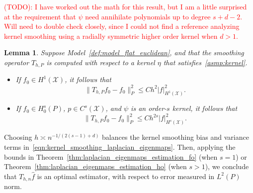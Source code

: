 \documentclass{article}
\newcommand{\1}{\mathbf{1}}
\newcommand{\mc}[1]{\mathcal{#1}}
\newcommand{\wh}[1]{\widehat{#1}}
\theoremstyle{alden}
\theoremstyle{aldenthm}
\newtheorem{theorem}{Theorem}
\newtheorem{lemma}{Lemma}
\theoremstyle{definition}
\theoremstyle{remark}
\begin{document}
\textcolor{red}{(TODO): I have worked out the math for this result, but I am a little surprised at the requirement that $\psi$ need annihilate polynomials up to degree $s + d - 2$. Will need to double check closely, since I could not find a reference analyzing kernel smoothing using a radially symmetric higher order kernel when $d > 1$.}
\begin{lemma}
	\label{lem:kernel_smoothing_bias}
	Suppose Model~\ref{def:model_flat_euclidean}, and that the smoothing operator $T_{h,P}$ is computed with respect to a kernel $\eta$ that satisfies~\ref{asmp:kernel}.
	\begin{itemize}
		\item If $f_0 \in H^1(\mc{X})$, it follows that
		\begin{equation*}
		\|T_{h,P}f_0 - f_0\|_P^2 \leq C h^{2} |f|_{H^1(\mc{X})}^2.
		\end{equation*}
		\item If $f_0 \in H_0^{s}(P)$, $p \in C^{s}(\mc{X})$, and $\psi$ is an order-$s$ kernel, it follows that
		\begin{equation*}
		\|T_{h,P}f_0 - f_0\|_P^2 \leq C h^{2s} |f|_{H^s(\mc{X})}^2.
		\end{equation*}
	\end{itemize}
\end{lemma}
Choosing $h \asymp n^{-1/(2(s - 1) + d)}$ balances the kernel smoothing bias and variance terms in~\eqref{eqn:kernel_smoothing_laplacian_eigenmaps}. Then, applying the bounds in Theorem~\ref{thm:laplacian_eigenmaps_estimation_fo} (when $s = 1$) or Theorem~\ref{thm:laplacian_eigenmaps_estimation_ho} (when $s > 1$), we conclude that $T_{h,n}\wh{f}$ is an optimal estimator, with respect to error measured in $L^2(P)$ norm.

\end{document}
